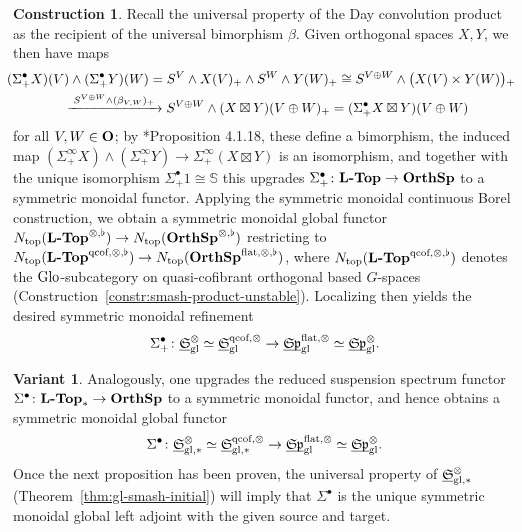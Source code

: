 \documentclass[reqno]{memo-l}
\theoremstyle{mythm}
\theoremstyle{definition}
\newtheorem{constr}[thm]{Construction}
\newtheorem{variant}[thm]{Variant}
\numberwithin{equation}{section}
\newcommand{\gl}{\textup{gl}}
\newcommand{\Ntop}{{N_\textup{top}}}
\newcommand{\cat}[1]{\textbf{\textup{#1}}}
\newcommand{\dual}{\flat}
\newcommand{\Glo}{\textup{Glo}}
\newcommand{\ulhelper}[2]{\underline{\setbox0=\hbox{$#1#2$}\dp0=0.4pt \box0\relax}}
\newcommand{\ul}[1]{{\mathpalette\ulhelper{#1}}\hbox{\rule[-2pt]{0pt}{0pt}}}
\let\smashp=\wedge
\newcommand{\mySp}{{\mathfrak S\kern-.5pt\mathfrak p}}
\newcommand{\myS}{{{\mathfrak S\kern-.4pt}}}
\newcommand{\osp}{{\textbf{\textup{OrthSp}}}}
\begin{document}
\begin{constr}\label{constr:sigma-bullet-sym-mon}
    Recall the universal property of the Day convolution product as the recipient of the universal bimorphism $\beta$. Given orthogonal spaces $X,Y$, we then have maps
    \begin{multline*}
        \hskip-5pt(\Sigma^\bullet_+X)(V)\smashp(\Sigma^\bullet_+Y)(W) = S^V\smashp X(V)_+\smashp S^W\smashp Y(W)_+
        \cong S^{V\oplus W}\smashp\big(X(V)\times Y(W)\big){}_+\\\xrightarrow{\;S^{V\oplus W}\smashp(\beta_{V,W})_+\;} S^{V\oplus W}\smashp(X\boxtimes Y)(V\oplus W)_+
        =(\Sigma^\bullet_+ X\boxtimes Y)(V\oplus W)
        \hskip-5pt
    \end{multline*}
    for all $V,W\in\cat{O}$; by \cite{schwede2018global}*{Proposition 4.1.18}, these define a bimorphism, the induced map $(\Sigma^\infty_+X)\smashp(\Sigma^\infty_+Y)\to \Sigma^\infty_+(X\boxtimes Y)$ is an isomorphism, and together with the unique isomorphism $\Sigma^\bullet_+1\cong\mathbb S$ this upgrades $\Sigma^\bullet_+\colon\cat{$\cat{L}$-Top}\to\osp$ to a symmetric monoidal functor.     
    Applying the symmetric monoidal continuous Borel construction, we obtain a symmetric monoidal global functor $\Ntop(\cat{$\cat{L}$-Top}^{\otimes,\dual})\to\Ntop(\osp^{\otimes,\dual})$ restricting to $\smash{\Ntop(\cat{$\cat{L}$-Top}^{\text{qcof},\otimes,\dual})\to\Ntop(\osp^{\text{flat},\otimes,\dual})}\vphantom{S^f}$, where $\Ntop(\cat{$\cat{L}$-Top}^{\text{qcof},\otimes,\dual})$ denotes the $\Glo$-subcategory on quasi-cofibrant orthogonal based $G$-spaces (Construction~\ref{constr:smash-product-unstable}). Localizing then yields the desired symmetric monoidal refinement
    \[
        \Sigma^\bullet_+\colon\ul\myS_\gl^\otimes\simeq\ul\myS_\gl^{\text{qcof},\otimes}\to
        \ul\mySp_\gl^{\text{flat},\otimes}\simeq\ul\mySp_\gl^\otimes.
    \]
\end{constr}

\begin{variant}\label{var:reduced-global-susp-spectrum}
    Analogously, one upgrades the reduced suspension spectrum functor $\Sigma^\bullet\colon\cat{$\cat{L}$-Top}_*\to\cat{OrthSp}$ to a symmetric monoidal functor, and hence obtains a symmetric monoidal global functor
    \[
        \Sigma^\bullet\colon\ul\myS_{\gl,*}^\otimes\simeq\ul\myS_{\gl,*}^{\text{qcof},\otimes}\to\ul\mySp_\gl^{\text{flat},\otimes}\simeq\ul\mySp_\gl^\otimes.
    \]
    Once the next proposition has been proven, the universal property of $\ul\myS_{\gl,*}^\otimes$ (Theorem~\ref{thm:gl-smash-initial}) will imply that $\Sigma^\bullet$ is the unique symmetric monoidal global left adjoint with the given source and target.
\end{variant}
\end{document}
